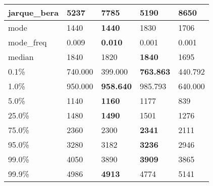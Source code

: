 \begin{table}[H]
\begin{tabular}{|l|m{10em}|m{10em}|m{10em}|m{10em}|}
\hline jarque\_bera & 5237 & 7785 & \bfseries 5190 & \cellcolor[rgb]{0.9, 0.54, 0.52} 8650 \\
\hline mode & 1440 & \bfseries 1440 & \cellcolor[rgb]{0.9, 0.54, 0.52} 1830 & 1706 \\
\hline mode\_freq & 0.009 & \bfseries 0.010 & \cellcolor[rgb]{0.9, 0.54, 0.52} 0.001 & 0.001 \\
\hline median & 1840 & 1820 & \bfseries 1840 & \cellcolor[rgb]{0.9, 0.54, 0.52} 1695 \\
\hline 0.1\% & 740.000 & \cellcolor[rgb]{0.9, 0.54, 0.52} 399.000 & \bfseries 763.863 & 440.792 \\
\hline 1.0\% & 950.000 & \bfseries 958.640 & 985.793 & \cellcolor[rgb]{0.9, 0.54, 0.52} 640.000 \\
\hline 5.0\% & 1140 & \bfseries 1160 & 1177 & \cellcolor[rgb]{0.9, 0.54, 0.52} 839 \\
\hline 25.0\% & 1480 & \bfseries 1490 & 1501 & \cellcolor[rgb]{0.9, 0.54, 0.52} 1276 \\
\hline 75.0\% & 2360 & 2300 & \bfseries 2341 & \cellcolor[rgb]{0.9, 0.54, 0.52} 2111 \\
\hline 95.0\% & 3280 & 3182 & \bfseries 3236 & \cellcolor[rgb]{0.9, 0.54, 0.52} 2946 \\
\hline 99.0\% & 4050 & 3890 & \bfseries 3909 & \cellcolor[rgb]{0.9, 0.54, 0.52} 3865 \\
\hline 99.9\% & 4986 & \bfseries 4913 & \cellcolor[rgb]{0.9, 0.54, 0.52} 4774 & 5141 \\
\hline
\end{tabular}
\end{table}
